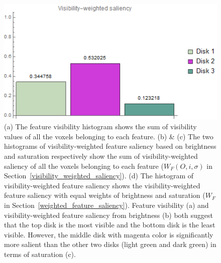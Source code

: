 \begin{figure}
\begin{minipage}{.45\textwidth}
		\subcaption{}
	\end{minipage}~
	\begin{minipage}{.45\textwidth}
		\includegraphics[width=1\linewidth]{images/disk_visibility_saliency_weighted_chart_left}
		\subcaption{}
	\end{minipage}
	\caption[The feature visibility histogram and the visiblity-weighted saliency histograms from the left viewpoint]{(a) The feature visibility \cite{wang_efficient_2011} histogram shows the sum of visibility values of all the voxels belonging to each feature.
		(b) \& (c) The two histograms of visibility-weighted feature saliency based on brightness and saturation respectively show the sum of visibility-weighted saliency of all the voxels belonging to each feature ($ W_{F}(O,i,\sigma) $ in Section~\ref{visibility_weighted_saliency}).
		(d) The histogram of visibility-weighted feature saliency shows the visibility-weighted feature saliency with equal weights of brightness and saturation ($ W_{F} $ in Section~\ref{weighted_feature_saliency}).
		Feature visibility (a) and visibility-weighted feature saliency from brightness (b) both suggest that the top disk is the most visible and the bottom disk is the least visible.
		However, the middle disk with magenta color is significantly more salient than the other two disks (light green and dark green) in terms of saturation (c).
	}
	\label{fig:disks_saliency_chart_left}
\end{figure}

